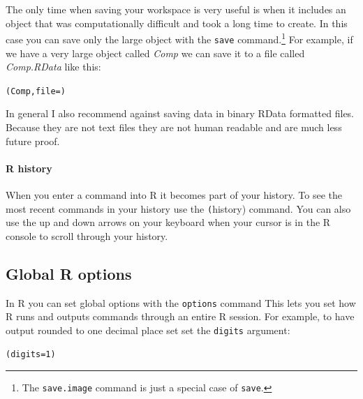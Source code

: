 \documentclass[krantz1]{krantz}
\begin{document}
The only time when saving your workspace is very useful is when it includes an object that was computationally difficult and took a long time to create. In this case you can save only the large object with the \texttt{save} command.\footnote{The \texttt{save.image} command is just a special case of \texttt{save}.}\label{RSave} For example, if we have a very large object called \emph{Comp} we can save it to a file called \emph{Comp.RData} like this:

\begin{knitrout}
\color{fgcolor}\begin{kframe}
\begin{alltt}
(Comp, file = )
\end{alltt}
\end{kframe}
\end{knitrout}


In general I also recommend against saving data in binary RData formatted files. Because they are not text files they are not human readable and are much less future proof.

\paragraph{R history}

When you enter a command into R it becomes part of your history. To see the most recent commands in your history use the \texttt(history) command. You can also use the up and down arrows on your keyboard when your cursor is in the R console to scroll through your history.

\subsection{Global R options}\label{ROptions}

In R you can set global options with the \texttt{options} command This lets you set how R runs and outputs commands through an entire R session. For example, to have output rounded to one decimal place set set the \texttt{digits} argument:

\begin{knitrout}
\color{fgcolor}\begin{kframe}
\begin{alltt}
(digits = 1)
\end{alltt}
\end{kframe}
\end{knitrout}
\end{document}
